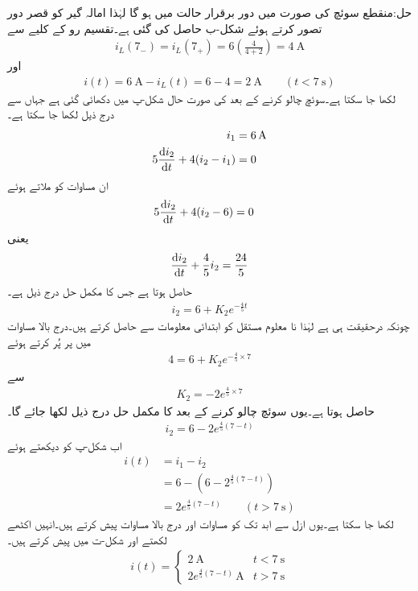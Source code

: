 حل:منقطع سوئچ کی صورت میں دور برقرار حالت میں ہو گا لہٰذا امالہ گیر کو قصر دور تصور کرتے ہوئے شکل-ب حاصل کی گئی ہے۔تقسیم رو کے کلیے سے
\begin{align*}
i_L(7_-)=i_L(7_+)=6\left(\frac{4}{4+2}\right)=\SI{4}{\ampere}
\end{align*}
اور
\begin{align}\label{مساوات_عارضی_امالہ_گیر_سات_سیکنڈ_الف}
i(t)=\SI{6}{\ampere}-i_L(t)=6-4=\SI{2}{\ampere} \quad \quad (t<\SI{7}{\second})
\end{align}
لکھا جا سکتا ہے۔سوئچ چالو کرنے کے بعد کی صورت حال شکل-پ میں دکھائی گئی ہے جہاں سے درج ذیل لکھا جا سکتا ہے۔
\begin{align*}
i_1&=\SI{6}{\ampere}\\
5\frac{\dif i_2}{\dif t}+4(i_2-i_1)&=0
\end{align*}
ان مساوات کو ملاتے ہوئے
\begin{align*}
5\frac{\dif i_2}{\dif t}+4(i_2-6)&=0
\end{align*}
یعنی
\begin{align*}
\frac{\dif i_2}{\dif t}+\frac{4}{5} i_2=\frac{24}{5}
\end{align*}
حاصل ہوتا ہے جس کا مکمل حل درج ذیل ہے۔
\begin{align*}
i_2=6+K_2e^{-\frac{4}{5}t}
\end{align*}
چونکہ  درحقیقت  ہی ہے لہٰذا نا معلوم مستقل  کو ابتدائی معلومات سے حاصل کرتے ہیں۔درج بالا مساوات میں   پر  پُر کرتے ہوئے 
\begin{align*}
4=6+K_2e^{-\frac{4}{5}\times 7}
\end{align*} 
سے
\begin{align*}
K_2=-2e^{\frac{4}{5}\times 7}
\end{align*}
حاصل ہوتا ہے۔یوں سوئچ چالو کرنے کے بعد  کا مکمل حل درج ذیل لکھا جائے گا۔
\begin{align*}
i_2=6-2e^{\frac{4}{5}(7-t)}
\end{align*}
اب شکل-پ کو دیکھتے ہوئے
\begin{align*}
i(t)&=i_1-i_2\\
&=6-\left(6-2^{\frac{4}{5}(7-t)}\right)\\
&=2e^{\frac{4}{5}(7-t)}\quad \quad (t>\SI{7}{\second})
\end{align*}
لکھا جا سکتا ہے۔یوں ازل سے ابد تک  کو مساوات  اور درج بالا مساوات  پیش کرتے ہیں۔انہیں اکٹھے لکھتے  اور شکل-ت میں پیش کرتے ہیں۔
\begin{align}
i(t)=
\begin{cases}
\SI{2}{\ampere} & t<\SI{7}{\second}\\
2e^{\frac{4}{5}(7-t)} \, \si{\ampere} & t>\SI{7}{\second}
\end{cases}
\end{align}
